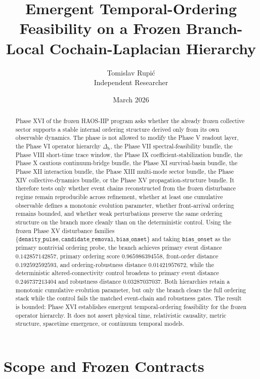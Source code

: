 \documentclass[11pt]{article}
\title{Emergent Temporal-Ordering Feasibility on a Frozen Branch-Local Cochain-Laplacian Hierarchy}
\author{Tomislav Rupi\'c \\ Independent Researcher}
\date{March 2026}
\begin{document}
\maketitle

\begin{abstract}
Phase XVI of the frozen HAOS-IIP program asks whether the already frozen collective sector supports a stable internal ordering structure derived only from its own observable dynamics. The phase is not allowed to modify the Phase V readout layer, the Phase VI operator hierarchy $\Delta_h$, the Phase VII spectral-feasibility bundle, the Phase VIII short-time trace window, the Phase IX coefficient-stabilization bundle, the Phase X cautious continuum-bridge bundle, the Phase XI survival-basin bundle, the Phase XII interaction bundle, the Phase XIII multi-mode sector bundle, the Phase XIV collective-dynamics bundle, or the Phase XV propagation-structure bundle. It therefore tests only whether event chains reconstructed from the frozen disturbance regime remain reproducible across refinement, whether at least one cumulative observable defines a monotonic evolution parameter, whether front-arrival ordering remains bounded, and whether weak perturbations preserve the same ordering structure on the branch more cleanly than on the deterministic control. Using the frozen Phase XV disturbance families $\{\texttt{density\_pulse}, \texttt{candidate\_removal}, \texttt{bias\_onset}\}$ and taking \texttt{bias\_onset} as the primary nontrivial ordering probe, the branch achieves primary event distance $0.142857142857$, primary ordering score $0.965986394558$, front-order distance $0.192592592593$, and ordering-robustness distance $0.01421957672$, while the deterministic altered-connectivity control broadens to primary event distance $0.246737213404$ and robustness distance $0.03287037037$. Both hierarchies retain a monotonic cumulative evolution parameter, but only the branch clears the full ordering stack while the control fails the matched event-chain and robustness gates. The result is bounded: Phase XVI establishes emergent temporal-ordering feasibility for the frozen operator hierarchy. It does not assert physical time, relativistic causality, metric structure, spacetime emergence, or continuum temporal models.
\end{abstract}

\section{Scope and Frozen Contracts}
\end{document}
